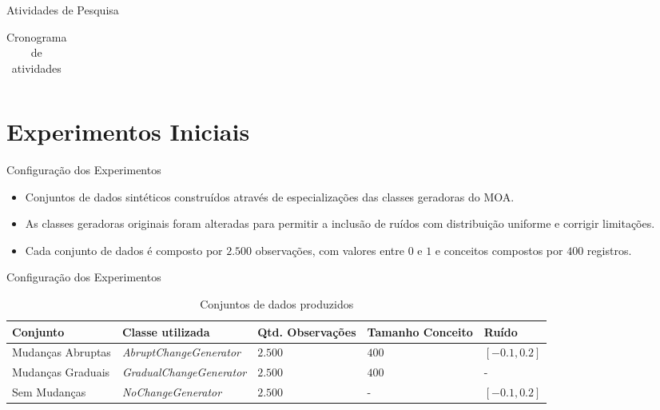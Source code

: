 \documentclass[10pt]{beamer}
\begin{document}
\begin{frame}{Atividades de Pesquisa}
\begin{table}[ht]
\begin{center}
{\begin{tabular}{|c|l|l|l|l|l|l|l|l|l|l|l|l|l|l|l|l|l|l|l|l|l|l|l|l|}
        \hline
        \end{tabular}
        } %
        \caption{Cronograma de atividades}     %
        \label{cronograma} %
        \end{center}
    \end{table}
\end{frame}

\section{Experimentos Iniciais}

\begin{frame}{Configuração dos Experimentos}
    \begin{itemize}
        \item<1 -> Conjuntos de dados sintéticos construídos através de especializações das classes geradoras do MOA.
        \item<2 -> As classes geradoras originais foram alteradas para permitir a inclusão de ruídos com distribuição uniforme e corrigir limitações.
        \item<3 -> Cada conjunto de dados é composto por \alert{$2.500$} observações, com valores \alert{entre $0$ e $1$} e conceitos compostos por \alert{$400$} registros.
      \end{itemize}
\end{frame}

\begin{frame}{Configuração dos Experimentos}
      \begin{center} 
        \begin{table}[h]
        \resizebox{\textwidth}{!} {%
        \begin{tabular}{llllm{7.5cm}}
        \toprule
        Conjunto & Classe utilizada & Qtd. Observações & Tamanho Conceito & Ruído \\
        \midrule
        Mudanças Abruptas          & \textit{AbruptChangeGenerator}  & $2.500$ & $400$ & $[-0.1, 0.2]$  \\
        Mudanças Graduais          & \textit{GradualChangeGenerator} & $2.500$ & $400$ & -  \\
        Sem Mudanças               & \textit{NoChangeGenerator}      & $2.500$ & -     & $[-0.1, 0.2]$  \\
        \bottomrule
        \end{tabular}
        }
        \caption{Conjuntos de dados produzidos}
        \label{tbl:configuracao_tarefa}
        \end{table}
    \end{center}
\end{frame}
\end{document}
